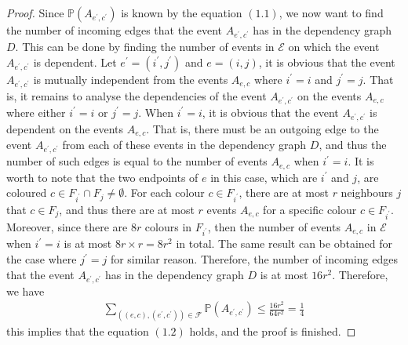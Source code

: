 \begin{proof}
  Since $\mathbb{P}(A_{e^{'},c^{'}})$ is known by the equation $(1.1)$, we now want to find the number of incoming edges that the event $A_{e^{'}, c^{'}}$ has in the dependency graph $D$. This can be done by finding the number of events in $\mathcal{E}$ on which the event $A_{e^{'},c^{'}}$ is dependent. Let $e^{'}=(i^{'},j^{'})$ and $e=(i,j)$, it is obvious that the event $A_{e^{'},c^{'}}$ is mutually independent from the events $A_{e,c}$ where $i^{'}=i$ and $j^{'}=j$. That is, it remains to analyse the dependencies of the event $A_{e^{'},c^{'}}$ on the events $A_{e,c}$ where either $i^{'}=i$ or $j^{'}=j$. When $i^{'}=i$, it is obvious that the event $A_{e^{'},c^{'}}$ is dependent on the events $A_{e,c}$. That is, there must be an outgoing edge to the event $A_{e^{'},c^{'}}$ from each of these events in the dependency graph $D$, and thus the number of such edges is equal to the number of events $A_{e,c}$ when $i^{'}=i$. It is worth to note that the two endpoints of $e$ in this case, which are $i^{'}$ and $j$, are coloured $c \in F_{i^{'}} \cap F_{j} \neq \emptyset$. For each colour $c \in F_{i^{'}}$, there are at most $r$ neighbours $j$ that $c \in F_{j}$, and thus there are at most $r$ events $A_{e,c}$ for a specific colour $c \in F_{i^{'}}$. Moreover, since there are $8r$ colours in $F_{i^{'}}$, then the number of events $A_{e,c}$ in $\mathcal{E}$ when $i^{'}=i$ is at most $8r \times r = 8r^{2}$ in total. The same result can be obtained for the case where $j^{'}=j$ for similar reason. Therefore, the number of incoming edges that the event $A_{e^{'},c^{'}}$ has in the dependency graph $D$ is at most $16r^{2}$. Therefore, we have
  \begin{align*}
    \sum_{\left( (e,c), (e^{'},c^{'}) \right) \in \mathcal{F}} \mathbb{P}(A_{e^{'}, c^{'}}) \leq \frac{16r^{2}}{64r^{2}} = \frac{1}{4}
  \end{align*}
  this implies that the equation $(1.2)$ holds, and the proof is finished.
\end{proof}

